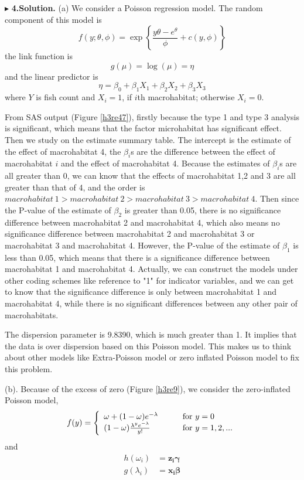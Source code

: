 \documentclass[letterpaper, 12pt]{article}
\newcommand{\ba}{$$\begin{aligned}}
\newcommand{\ea}{\end{aligned}$$}
\begin{document}
$\blacktriangleright$ \textbf{4.\quad Solution.} 
(a) We consider a Poisson regression model. The random component of this model is 
$$
f(y;\theta,\phi)=\exp\left\{\frac{y\theta-e^\theta}{\phi}+c(y,\phi)\right\}
$$
the link function is 
$$
g(\mu)=\log(\mu)=\eta
$$
and the linear predictor is
$$
\eta=\beta_0+\beta_1X_1+\beta_2X_2+\beta_3X_3
$$
where $Y$ is fish count and $X_{i}=1$, if $i$th macrohabitat; otherwise $X_{i}=0$. 

From SAS output (Figure \ref{h3re47}), firstly because the type 1 and type 3 analysis is significant, which means that the factor microhabitat has significant effect. Then we study on the estimate summary table. The intercept is the estimate of the effect of macrohabitat 4, the $\beta_i$s are the difference between the effect of macrohabitat $i$ and the effect of macrohabitat 4. Because the estimates of $\beta_i$s are all greater than 0, we can know that the effects of macrohabitat 1,2 and 3 are all greater than that of 4, and the order is $macrohabitat ~1>macrohabitat ~2>macrohabitat ~3>macrohabitat ~4$. Then since the P-value of the estimate of $\beta_2$ is greater than 0.05, there is no significance difference between macrohabitat 2 and macrohabitat 4, which also means no significance difference between macrohabitat 2 and macrohabitat 3 or macrohabitat 3 and macrohabitat 4. However, the P-value of the estimate of $\beta_1$ is less than 0.05, which means that there is a significance difference between macrohabitat 1 and macrohabitat 4. Actually, we can construct the models under other coding schemes like reference to "1" for indicator variables, and we can get to know that the significance difference is only between macrohabitat 1 and macrohabitat 4, while there is no significant differences between any other pair of macrohabitats.

The dispersion parameter is 9.8390, which is much greater than 1. It implies that the data is over dispersion based on this Poisson model. This makes us to think about other models like Extra-Poisson model or zero inflated Poisson model to fix this problem.


(b). Because of the excess of zero (Figure \ref{h3re9}), we consider the zero-inflated Poisson model,
$$
f(y)=\left\{\begin{array}{l l}\omega+(1-\omega)e^{-\lambda}\qquad &\text{for }y=0\\
(1-\omega)\frac{\lambda^ye^{-\lambda}}{y!}\qquad &\text{for }y=1,2,...
\end{array}\right.
$$
and
\ba
h(\omega_i)&=\bm{z_i}\bm{\gamma}\\
g(\lambda_i)&=\bm{x_i}\bm{\beta}
\ea
\end{document}
